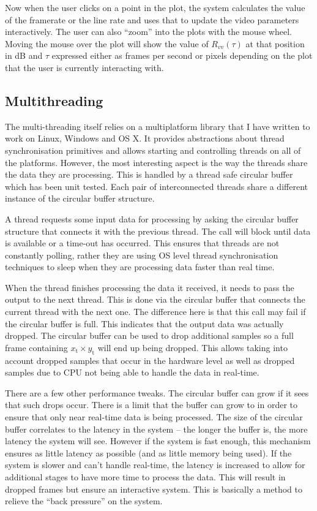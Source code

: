 \documentclass[a4paper,12pt,twoside,openright]{report}
\begin{document}
Now when the user clicks on a point in the plot, the system calculates the value of the framerate or the line rate and uses that to update the video parameters interactively. The user can also ``zoom'' into the plots with the mouse wheel. Moving the mouse over the plot will show the value of $R_{vv}(\tau)$ at that position in dB and $\tau$ expressed either as frames per second or pixels depending on the plot that the user is currently interacting with. 

\subsection{Multithreading}

The multi-threading itself relies on a multiplatform library that I have written to work on Linux, Windows and OS X. It provides abstractions about thread synchronisation primitives and allows starting and controlling threads on all of the platforms. However, the most interesting aspect is the way the threads share the data they are processing. This is handled by a thread safe circular buffer which has been unit tested. Each pair of interconnected threads share a different instance of the circular buffer structure.

A thread requests some input data for processing by asking the circular buffer structure that connects it with the previous thread. The call will block until data is available or a time-out has occurred. This ensures that threads are not constantly polling, rather they are using OS level thread synchronisation techniques to sleep when they are processing data faster than real time.

When the thread finishes processing the data it received, it needs to pass the output to the next thread. This is done via the circular buffer that connects the current thread with the next one. The difference here is that this call may fail if the circular buffer is full. This indicates that the output data was actually dropped. The circular buffer can be used to drop additional samples so a full frame containing $x_\text{t} \times y_\text{t}$ will end up being dropped. This allows taking into account dropped samples that occur in the hardware level as well as dropped samples due to CPU not being able to handle the data in real-time.

There are a few other performance tweaks. The circular buffer can grow if it sees that such drops occur. There is a limit that the buffer can grow to in order to ensure that only near real-time data is being processed. The size of the circular buffer correlates to the latency in the system -- the longer the buffer is, the more latency the system will see. However if the system is fast enough, this mechanism ensures as little latency as possible (and as little memory being used). If the system is slower and can't handle real-time, the latency is increased to allow for additional stages to have more time to process the data. This will result in dropped frames but ensure an interactive system. This is basically a method to relieve the ``back pressure'' on the system. 
\end{document}
